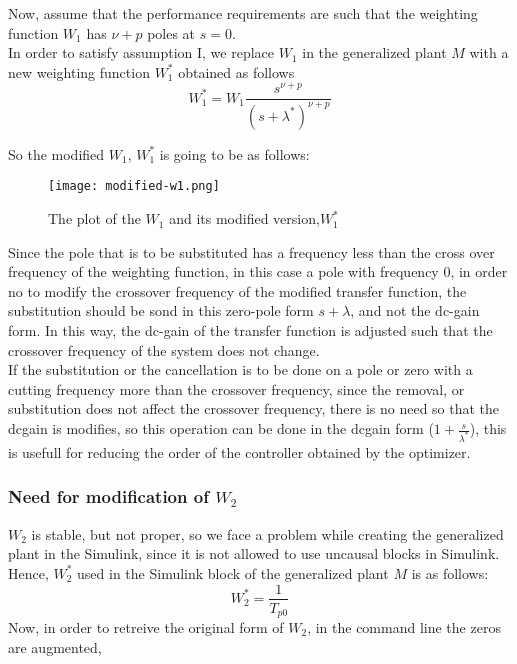 Now, assume that the performance requirements are such that the weighting function $W_1$ has $\nu + p$ poles at $s = 0$.\\

In order to satisfy assumption I, we replace $W_1$ in the generalized plant $M$ with a new weighting function $W_1^{*}$ obtained as follows\\
\[
W_1^{*} = W_1 \frac{s^{\nu+p}}{(s + \lambda^{*})^{\nu + p}}
\]

So the modified $W_1$, $W_1^{*}$ is going to be as follows:

\begin{figure}[H]
    \centering
    \texttt{[image: modified-w1.png]}
    \caption{The plot of the $W_1$ and its modified version,$W_1^{*}$}
\end{figure}


\begin{factbox}
Since the pole that is to be substituted has a frequency less than the cross over frequency of the weighting function, in this case a pole with frequency 0, in order no to modify the crossover frequency of the modified transfer function, the substitution should be sond in this zero-pole form $s + \lambda$, and not the dc-gain form. In this way, the dc-gain of the transfer function is adjusted such that the crossover frequency of the system does not change.\\

If the substitution or the cancellation is to be done on a pole or zero with a cutting frequency more than the crossover frequency, since the removal, or substitution does not affect the crossover frequency, there is no need so that the dcgain is modifies, so this operation can be done in the dcgain form ($1 + \frac{s}{\lambda^{*}}$), this is usefull for reducing the order of the controller obtained by the optimizer.
\end{factbox}

\newpage

\subsubsection{Need for modification of $W_2$}
$W_2$ is stable, but not proper, so we face a problem while creating the generalized plant in the Simulink, since it is not allowed to use uncausal blocks in Simulink. Hence, $W_2^{*}$ used in the Simulink block of the generalized plant $M$ is as follows:
\[
W_2^{*} = \frac{1}{T_{p0}}
\]
Now, in order to retreive the original form of $W_2$, in the command line the zeros are augmented,\\

